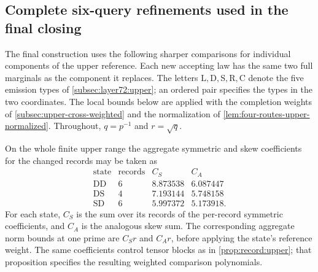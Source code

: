 \subsection{Complete six-query refinements used in the final closing}
\label{subsec:upper-six-refinements}

The final construction uses the following sharper comparisons for
individual components of the upper reference. Each new accepting law
has the same two full marginals as the component it replaces.
The letters $\mathrm L,\mathrm D,\mathrm S,\mathrm R,\mathrm C$
denote the five emission types of \cref{subsec:layer72:upper};
an ordered pair specifies the types in the two coordinates.
The local bounds below are applied with the completion weights of
\cref{subsec:upper-cross-weighted} and the normalization of
\cref{lem:four-routes-upper-normalized}. Throughout,
$q=p^{-1}$ and $r=\sqrt q$.

\begin{proposition}\label{prop:upper-soft-nine}
On the whole finite upper range the aggregate symmetric and skew
coefficients for the changed records may be taken as
\[
\begin{array}{c|r|r|r}
\text{state}&\text{records}&C_S&C_A\\ \hline
\mathrm{DD}&6&8.873538&6.087447\\
\mathrm{DS}&4&7.193144&5.748158\\
\mathrm{SD}&6&5.997372&5.173918.
\end{array}
\]
For each state, $C_S$ is the sum over its records of the
per-record symmetric coefficients, and $C_A$ is the analogous skew
sum. The corresponding aggregate norm bounds at one prime are
$C_Sr$ and $C_Ar$, before applying the state's reference weight.
The same coefficients control tensor blocks as in
\cref{prop:record:upper}; that proposition specifies the resulting
weighted comparison polynomials.
\end{proposition}

